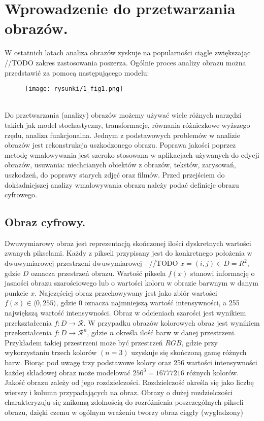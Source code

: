 \documentclass[12pt, twoside, openany]{report}
\theoremstyle{definition}
\begin{document}
\newpage
\printunsrtglossary[type=symbols, style=long, title={Wykaz oznaczeń i symboli}]
    

\chapter{Wprowadzenie do przetwarzania obrazów.}
W ostatnich latach analiza obrazów zyskuje na popularności ciągle zwiększając //TODO zakres zastosowania poszerza. Ogólnie proces analizy obrazu można przedstawić za pomocą następującego modelu: \\
\begin{figure}[!h]
	\centering
	\texttt{[image: rysunki/1\_fig1.png]}
\end{figure}
\\
Do przetwarzania (analizy) obrazów możemy używać wiele różnych narzędzi takich jak model stochastyczny, transformacje, równania różniczkowe wyższego rzędu, analiza funkcjonalna. Jednym z podstawowych problemów w analizie obrazów jest rekonstrukcja uszkodzonego obrazu. Poprawa jakości poprzez metodę wmalowywania jest szeroko stosowana w aplikacjach używanych do edycji obrazów, usuwania: niechcianych obiektów z obrazów, tekstów, zarysowań, uszkodzeń, do poprawy starych zdjęć oraz filmów. Przed przejściem do dokładniejszej analizy wmalowywania obrazu należy podać definicje obrazu cyfrowego.
\section{Obraz cyfrowy.}
Dwuwymiarowy obraz jest reprezentacją skończonej ilości dyskretnych wartości zwanych pikselami.
Każdy z pikseli przypisany jest do konkretnego położenia w dwuwymiarowej przestrzeni dwuwymiarowej - //TODO $x = (i,j) \in D=R^2$, gdzie $D$ oznacza przestrzeń obrazu.
Wartość piksela $f(x)$ stanowi informację o jasności obrazu szarościowego lub o wartości koloru w obrazie barwnym w danym punkcie $x$. Najczęściej obraz przechowywany jest jako zbiór wartości $f(x) \in \langle 0,255 \rangle$, gdzie 0 oznacza najmniejszą wartość intensywności, a 255 największą wartość intensywności. Obraz w odcieniach szarości jest wynikiem przekształcenia $f: D \rightarrow \mathcal{R}$.
W przypadku obrazów kolorowych obraz jest wynikiem przekształcenia $f: D \rightarrow \mathcal{R}^n$, gdzie $n$ określa ilość barw w danej przestrzeni.
Przykładem takiej przestrzeni może być przestrzeń $RGB$, gdzie przy wykorzystaniu trzech kolorów $(n=3)$ uzyskuje się skończoną gamę różnych barw. Biorąc pod uwagę trzy podstawowe kolory oraz 256 wartości intensywności każdej składowej obraz może modelować $256^3=16777216$ różnych kolorów. Jakość obrazu zależy od jego rozdzielczości. Rozdzielczość określa się jako liczbę wierszy i kolumn przypadających na obraz. Obrazy o dużej rozdzielczości charakteryzują się znikomą zdolnością do rozróżnienia poszczególnych pikseli obrazu, dzięki czemu w ogólnym wrażeniu tworzy obraz ciągły (wygładzony)
\end{document}
